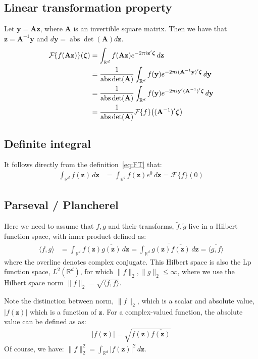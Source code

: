 \documentclass[a4paper,oneside,12pt,english]{report}
\def\zvec{\mathbf{z}}
\DeclareMathOperator{\abs}{abs}
\def\R{\mathbb{R}}
\def\yvec{\mathbf{y}}
\def\Fset{\mathcal{F}}
\newcommand\FT[2][]{\Fset_{#1}\{#2\}}
\def\conj#1{\overline{#1}}
\begin{document}
\subsection{Linear transformation property}
\def\Amat{\mathbf{A}}
Let $\yvec = \Amat\zvec$, where $\Amat$ is an invertible square matrix. Then we have that $\zvec = \Amat^{-1}\yvec$ and $d\yvec = \abs{\det(\Amat)}d\zvec$. 
\begin{align}
\label{eq:ftscaling}
\begin{split}
\FT{f(\Amat\zvec)}(\zetavec) &= \int_{\R^d} f(\Amat\zvec)e^{-2\uppi i\zvec'\zetavec}\,d\zvec\\
&= \frac1{\abs{\det(\Amat)}}\int_{\R^d} f(\yvec)e^{-2\uppi i(\Amat^{-1}\yvec)'\zetavec}\,d\yvec\\
&= \frac1{\abs{\det(\Amat)}}\int_{\R^d} f(\yvec)e^{-2\uppi i\yvec'(\Amat^{-1})'\zetavec}\,d\yvec\\
&= \frac1{\abs{\det(\Amat)}}\FT{f}\bigl((\Amat^{-1})'\zetavec\bigr)
\end{split}
\end{align}

 
\subsection{Definite integral}
It follows directly from the definition~\eqref{eq:FT} that:
\begin{align}
\label{eq:di}
\int_{\R^d} f(\zvec)\,d\zvec &= \int_{\R^d} f(\zvec)e^0\,d\zvec = \FT{f}(0)
\end{align}



\subsection{Parseval / Plancherel}
\def\dotp#1#2{\langle#1,#2\rangle}
\def\norm#1{\lVert#1\rVert_2}
\def\abs#1{\lvert#1\rvert}
Here we need to assume that $f,g$ and their transforms, $\tilde f,\tilde g$ live in a Hilbert function space, with inner product defined as:
\begin{align}
\dotp{f}{g} &= \int_{\R^d} f(\zvec)\conj{g(\zvec)} \,d\zvec
= \conj{\int_{\R^d} g(\zvec)\conj{f(\zvec)} \,d\zvec} = \conj{\dotp{g}{f}}
\end{align}
where the overline denotes complex conjugate. This Hilbert space is also the Lp function space, $L^2(\R^d)$, for which $\norm{f},\norm{g}\le\infty$, where we use the Hilbert space norm $\norm{f}=\sqrt{\dotp{f}{f}}$.

Note the distinction between norm, $\norm{f}$, which is a scalar and absolute value, $\abs{f(\zvec)}$ which is a function of $\zvec$. For a complex-valued function, the absolute value can be defined as as:
\begin{align}
\abs{f(\zvec)}=\sqrt{f(\zvec)\conj{f(\zvec)}}
\end{align}
Of course, we have: $\norm{f}^2=\int_{\R^d}\abs{f(\zvec)}^2\,d\zvec$.\\
\end{document}
